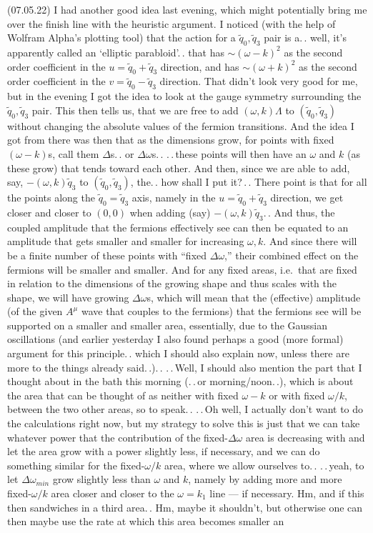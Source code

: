 \documentclass{report}
\begin{document}
(07.05.22) I had another good idea last evening, which might potentially bring me over the finish line with the heuristic argument. I noticed (with the help of Wolfram Alpha's plotting tool) that the action for a $\tilde q_0, \tilde q_3$ pair is a.\,. well, it's apparently called an `elliptic parabloid'.\,. that has $\sim(\omega - k)^2$ as the second order coefficient in the $u = \tilde q_0 + \tilde q_3$ direction, and has $\sim(\omega + k)^2$ as the second order coefficient in the $v = \tilde q_0 - \tilde q_3$ direction. That didn't look very good for me, but in the evening I got the idea to look at the gauge symmetry surrounding the $\tilde q_0, \tilde q_3$ pair. This then tells us, that we are free to add $(\omega, k)\Lambda$ to $(\tilde q_0, \tilde q_3)$ without changing the absolute values of the fermion transitions. And the idea I got from there was then that as the dimensions grow, for points with fixed $(\omega - k)$s, call them $\Delta$s.\,. or $\Delta\omega$s.\,. .\,.\,these points will then have an $\omega$ and $k$ (as these grow) that tends toward each other. And then, since we are able to add, say, $-(\omega, k)\tilde q_3$ to $(\tilde q_0, \tilde q_3)$, the.\,. how shall I put it?\,.\,. There point is that for all the points along the $\tilde q_0 = \tilde q_3$ axis, namely in the $u = \tilde q_0 + \tilde q_3$ direction, we get closer and closer to $(0, 0)$ when adding (say) $-(\omega, k)\tilde q_3$.\,. And thus, the coupled amplitude that the fermions effectively see can then be equated to an amplitude that gets smaller and smaller for increasing $\omega, k$. And since there will be a finite number of these points with ``fixed $\Delta\omega$,'' their combined effect on the fermions will be smaller and smaller. And for any fixed areas, i.e.\ that are fixed in relation to the dimensions of the growing shape and thus scales with the shape, we will have growing $\Delta\omega$s, which will mean that the (effective) amplitude (of the given $A^\mu$ wave that couples to the fermions) that the fermions see will be supported on a smaller and smaller area, essentially, due to the Gaussian oscillations (and earlier yesterday I also found perhaps a good (more formal) argument for this principle.\,. which I should also explain now, unless there are more to the things already said.\,.).\,. .\,.\,Well, I should also mention the part that I thought about in the bath this morning (.\,.\,or morning/noon.\,.), which is about the area that can be thought of as neither with fixed $\omega - k$ or with fixed $\omega / k$, between the two other areas, so to speak.\,. .\,.\,Oh well, I actually don't want to do the calculations right now, but my strategy to solve this is just that we can take whatever power that the contribution of the fixed-$\Delta\omega$ area is decreasing with and let the area grow with a power slightly less, if necessary, and we can do something similar for the fixed-$\omega/k$ area, where we allow ourselves to.\,. .\,.\,yeah, to let $\Delta\omega_{min}$ grow slightly less than $\omega$ and $k$, namely by adding more and more fixed-$\omega/k$ area closer and closer to the $\omega = k_1$ line --- if necessary. Hm, and if this then sandwiches in a third area.\,. Hm, maybe it shouldn't, but otherwise one can then maybe use the rate at which this area becomes smaller an 
\end{document}

